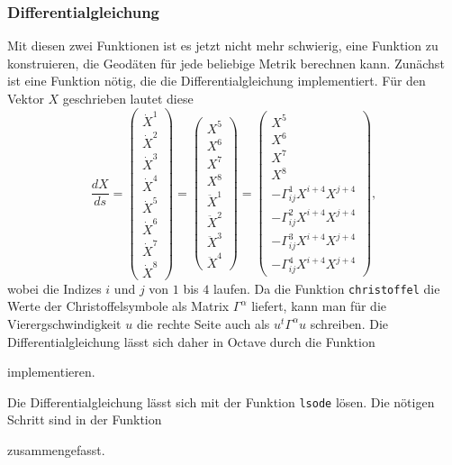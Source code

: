 \subsubsection{Differentialgleichung}
Mit diesen zwei Funktionen ist es jetzt nicht mehr schwierig, eine Funktion
zu konstruieren, die Geodäten für jede beliebige Metrik berechnen kann.
Zunächst ist eine Funktion nötig, die die Differentialgleichung implementiert.
Für den Vektor $X$ geschrieben lautet diese
\[
\frac{dX}{ds}
=
\begin{pmatrix}
\dot X^1\\
\dot X^2\\
\dot X^3\\
\dot X^4\\
\dot X^5\\
\dot X^6\\
\dot X^7\\
\dot X^8
\end{pmatrix}
=
\begin{pmatrix}
X^5\\X^6\\X^7\\X^8
\\
\ddot X^1\\
\ddot X^2\\
\ddot X^3\\
\ddot X^4
\end{pmatrix}
=
\begin{pmatrix}
X^5\\X^6\\X^7\\X^8
\\
-\Gamma^1_{ij}X^{i+4}X^{j+4}\\
-\Gamma^2_{ij}X^{i+4}X^{j+4}\\
-\Gamma^3_{ij}X^{i+4}X^{j+4}\\
-\Gamma^4_{ij}X^{i+4}X^{j+4}
\end{pmatrix},
\]
wobei die Indizes $i$ und $j$ von $1$ bis $4$ laufen.
Da die Funktion \texttt{christoffel} die Werte der Christoffelsymbole
als Matrix $\Gamma^\alpha$ liefert, kann man für die Vierergschwindigkeit
$u$ die rechte Seite auch als $u^t \Gamma^\alpha u$ schreiben.
Die Differentialgleichung lässt sich daher in Octave durch die
Funktion

implementieren.

Die Differentialgleichung lässt sich mit der Funktion \texttt{lsode}
lösen.
Die nötigen Schritt sind in der Funktion

zusammengefasst.

